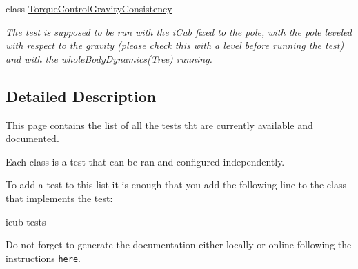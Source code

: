 \begin{DoxyCompactItemize}
class \hyperlink{classTorqueControlGravityConsistency}{Torque\+Control\+Gravity\+Consistency}
\begin{DoxyCompactList}\small\item\em The test is supposed to be run with the i\+Cub fixed to the pole, with the pole leveled with respect to the gravity (please check this with a level before running the test) and with the whole\+Body\+Dynamics(\+Tree) running. \end{DoxyCompactList}\end{DoxyCompactItemize}


\subsection{Detailed Description}
This page contains the list of all the tests tht are currently available and documented. 

Each class is a test that can be ran and configured independently.

To add a test to this list it is enough that you add the following line to the class that implements the test\+:

\begin{DoxyVerb}\ingroup icub-tests\end{DoxyVerb}


Do not forget to generate the documentation either locally or online following the instructions \href{https://github.com/robotology/icub-tests/}{\tt here}. 